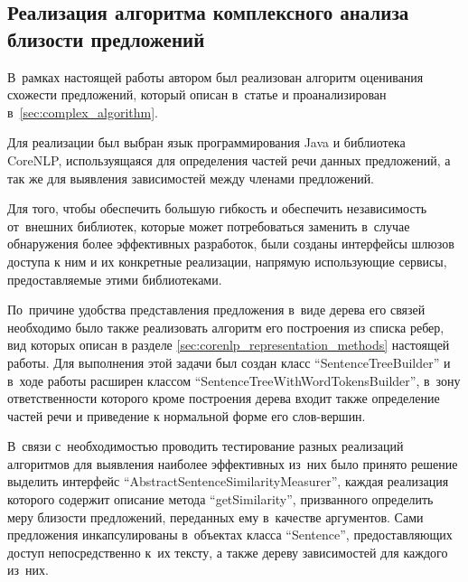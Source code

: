 \subsection{Реализация алгоритма комплексного анализа близости предложений}
В~рамках настоящей работы автором был реализован алгоритм оценивания
схожести предложений, который описан в~статье\cite{complexSim} и
проанализирован в~\ref{sec:complex_algorithm}.

Для реализации был выбран язык программирования Java и библиотека CoreNLP\cite{corenlp},
используящаяся для определения частей речи данных предложений, а так же для выявления зависимостей
между членами предложений.

Для того, чтобы обеспечить большую гибкость и обеспечить независимость от~внешних библиотек,
которые может потребоваться заменить в~случае обнаружения более эффективных разработок,
были созданы интерфейсы шлюзов доступа к ним и их конкретные реализации, напрямую
использующие сервисы, предоставляемые этими библиотеками.

По~причине удобства представления предложения в~виде дерева его связей
необходимо было также реализовать алгоритм его построения из списка ребер, 
вид которых описан в разделе \ref{sec:corenlp_representation_methods} настоящей работы.
Для выполнения этой задачи был создан класс ``SentenceTreeBuilder'' и в~ходе работы расширен
классом ``SentenceTreeWithWordTokensBuilder'', в~зону ответственности которого
кроме построения дерева входит также определение частей речи и приведение к нормальной форме
его слов-вершин.



В~связи с~необходимостью проводить тестирование разных реализаций алгоритмов
для выявления наиболее эффективных из~них было принято решение выделить интерфейс
``AbstractSentenceSimilarityMeasurer'', каждая реализация которого содержит описание метода ``getSimilarity'',
призванного определить меру близости предложений, переданных ему в~качестве аргументов.
Сами предложения инкапсулированы в~объектах класса ``Sentence'', предоставляющих доступ
непосредственно к~их тексту, а также дереву зависимостей для каждого из~них.


